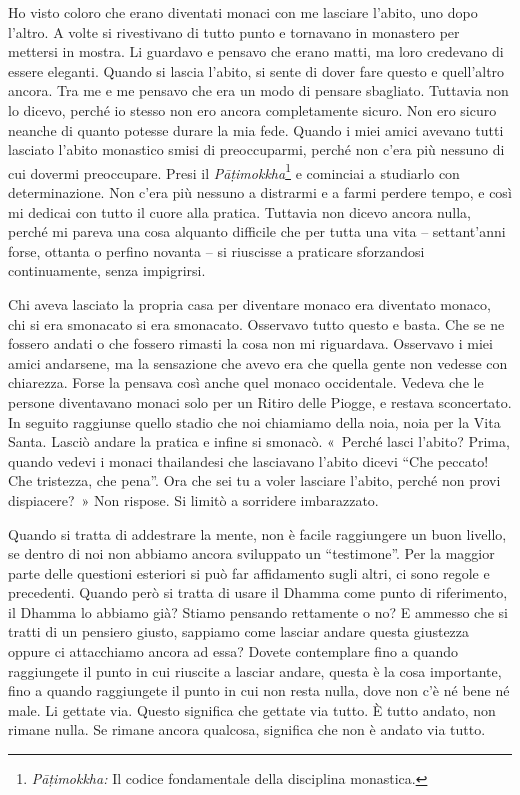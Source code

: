 Ho visto coloro che erano diventati monaci con me lasciare l'abito, uno
dopo l'altro. A volte si rivestivano di tutto punto e tornavano in
monastero per mettersi in mostra. Li guardavo e pensavo che erano matti,
ma loro credevano di essere eleganti. Quando si lascia l'abito, si sente
di dover fare questo e quell'altro ancora. Tra me e me pensavo che era
un modo di pensare sbagliato. Tuttavia non lo dicevo, perché io stesso
non ero ancora completamente sicuro. Non ero sicuro neanche di quanto
potesse durare la mia fede. Quando i miei amici avevano tutti lasciato
l'abito monastico smisi di preoccuparmi, perché non c'era più nessuno di
cui dovermi preoccupare. Presi il \emph{Pāṭimokkha}\footnote{\emph{Pāṭimokkha:}
  Il codice fondamentale della disciplina monastica.} e cominciai a
studiarlo con determinazione. Non c'era più nessuno a distrarmi e a
farmi perdere tempo, e così mi dedicai con tutto il cuore alla pratica.
Tuttavia non dicevo ancora nulla, perché mi pareva una cosa alquanto
difficile che per tutta una vita -- settant'anni forse, ottanta o
perfino novanta -- si riuscisse a praticare sforzandosi continuamente,
senza impigrirsi.

Chi aveva lasciato la propria casa per diventare monaco era diventato
monaco, chi si era smonacato si era smonacato. Osservavo tutto questo e
basta. Che se ne fossero andati o che fossero rimasti la cosa non mi
riguardava. Osservavo i miei amici andarsene, ma la sensazione che avevo
era che quella gente non vedesse con chiarezza. Forse la pensava così
anche quel monaco occidentale. Vedeva che le persone diventavano monaci
solo per un Ritiro delle Piogge, e restava sconcertato. In seguito
raggiunse quello stadio che noi chiamiamo della noia, noia per la Vita
Santa. Lasciò andare la pratica e infine si smonacò. «~Perché lasci
l'abito? Prima, quando vedevi i monaci thailandesi che lasciavano
l'abito dicevi ``Che peccato! Che tristezza, che pena''. Ora che sei tu
a voler lasciare l'abito, perché non provi dispiacere?~» Non rispose. Si
limitò a sorridere imbarazzato.

Quando si tratta di addestrare la mente, non è facile raggiungere un
buon livello, se dentro di noi non abbiamo ancora sviluppato un
``testimone''. Per la maggior parte delle questioni esteriori si può far
affidamento sugli altri, ci sono regole e precedenti. Quando però si
tratta di usare il Dhamma come punto di riferimento, il Dhamma lo
abbiamo già? Stiamo pensando rettamente o no? E ammesso che si tratti di
un pensiero giusto, sappiamo come lasciar andare questa giustezza oppure
ci attacchiamo ancora ad essa? Dovete contemplare fino a quando
raggiungete il punto in cui riuscite a lasciar andare, questa è la cosa
importante, fino a quando raggiungete il punto in cui non resta nulla,
dove non c'è né bene né male. Li gettate via. Questo significa che
gettate via tutto. È tutto andato, non rimane nulla. Se rimane ancora
qualcosa, significa che non è andato via tutto.

